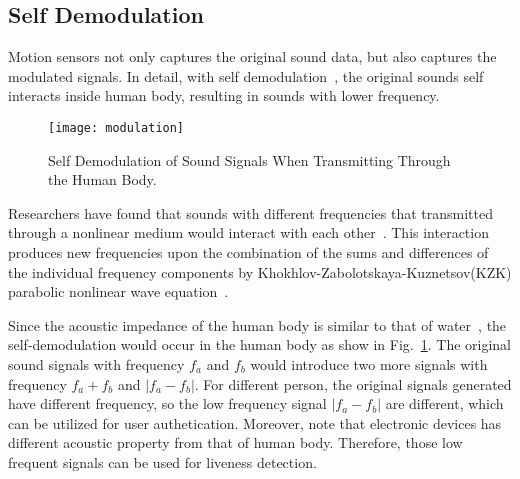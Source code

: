 

%


\subsection{Self Demodulation}
Motion sensors not only captures the original sound data, but also captures the modulated signals. In detail, with self demodulation~\cite{berktay1965possible}, the original sounds self interacts  inside  human body,  resulting in sounds with  lower frequency.

\begin{figure}[h]
	\centering
		\texttt{[image: modulation]}
	\caption{Self Demodulation of Sound Signals  When Transmitting Through the Human Body.}
	\label{fig:modulation}
\end{figure}

Researchers have found that sounds with different frequencies that transmitted through a nonlinear medium would interact with each other~\cite{pompei1998use}. This interaction produces new frequencies upon the combination of the sums and differences of the individual frequency components by Khokhlov-Zabolotskaya-Kuznetsov(KZK) parabolic nonlinear wave equation~\cite{novikov1987nonlinear}. 

Since the acoustic impedance of the human body is similar to that of water~\cite{kim2014sound}, the self-demodulation would occur in the human body as show in Fig.~\ref{fig:modulation}. 
The original sound signals with frequency $f_a$ and $f_b$ would introduce two more signals with frequency $f_a + f_b$ and $|f_a - f_b|$. For different person, the original signals generated have different frequency, so the low frequency signal $|f_a - f_b|$ are different, which can be utilized for user authetication.
%
Moreover, note that electronic devices has different acoustic property from that of human body. Therefore, those low frequent signals can be used for liveness detection.

